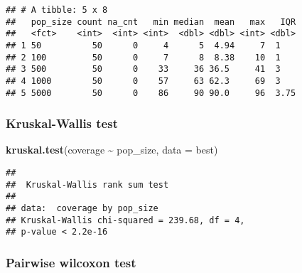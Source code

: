 \documentclass[
]{book}
\newenvironment{Shaded}{\begin{snugshade}}{\end{snugshade}}
\newcommand{\AttributeTok}[1]{\textcolor[rgb]{0.13,0.29,0.53}{#1}}
\newcommand{\ConstantTok}[1]{\textcolor[rgb]{0.56,0.35,0.01}{#1}}
\newcommand{\FunctionTok}[1]{\textcolor[rgb]{0.13,0.29,0.53}{\textbf{#1}}}
\newcommand{\NormalTok}[1]{#1}
\newcommand{\SpecialCharTok}[1]{\textcolor[rgb]{0.81,0.36,0.00}{\textbf{#1}}}
\newcommand{\StringTok}[1]{\textcolor[rgb]{0.31,0.60,0.02}{#1}}
\begin{document}
\begin{verbatim}
## # A tibble: 5 x 8
##   pop_size count na_cnt   min median  mean   max   IQR
##   <fct>    <int>  <int> <int>  <dbl> <dbl> <int> <dbl>
## 1 50          50      0     4      5  4.94     7  1   
## 2 100         50      0     7      8  8.38    10  1   
## 3 500         50      0    33     36 36.5     41  3   
## 4 1000        50      0    57     63 62.3     69  3   
## 5 5000        50      0    86     90 90.0     96  3.75
\end{verbatim}

\hypertarget{kruskal-wallis-test-4}{%
\subsubsection{Kruskal-Wallis test}\label{kruskal-wallis-test-4}}

\begin{Shaded}
\begin{Highlighting}[]
\FunctionTok{kruskal.test}\NormalTok{(coverage }\SpecialCharTok{\textasciitilde{}}\NormalTok{ pop\_size, }\AttributeTok{data =}\NormalTok{ best)}
\end{Highlighting}
\end{Shaded}

\begin{verbatim}
## 
##  Kruskal-Wallis rank sum test
## 
## data:  coverage by pop_size
## Kruskal-Wallis chi-squared = 239.68, df = 4,
## p-value < 2.2e-16
\end{verbatim}

\hypertarget{pairwise-wilcoxon-test-4}{%
\subsubsection{Pairwise wilcoxon test}\label{pairwise-wilcoxon-test-4}}

\begin{Shaded}
\end{Shaded}
\end{document}
